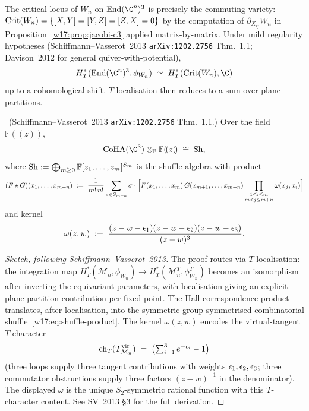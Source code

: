 \begin{remark}
\label{w17:rem:vanishing-cycle-local}
The critical locus of $W_n$ on $\mathrm{End}(\C^n)^3$ is precisely the commuting
variety: $\mathrm{Crit}(W_n) = \{[X, Y] = [Y, Z] = [Z, X] = 0\}$ by the computation of
$\partial_{X_{ij}} W_n$ in Proposition~\ref{w17:prop:jacobi-c3} applied matrix-by-matrix.
Under mild regularity hypotheses (Schiffmann--Vasserot~2013
\texttt{arXiv:1202.2756} Thm.~1.1; Davison~2012 for general quiver-with-potential),
\[
 H^*_T(\mathrm{End}(\C^n)^3, \phi_{W_n})
 \;\simeq\; H^*_T(\Crit(W_n), \C)
\]
up to a cohomological shift. $T$-localisation then reduces to a sum over plane
partitions.
\end{remark}

\begin{theorem}
\label{w17:thm:sv-shuffle}
\ClaimStatusProvedElsewhere\ (Schiffmann--Vasserot~2013 \texttt{arXiv:1202.2756}
Thm.~1.1.) Over the field $\mathbb{F}(\!(z)\!)$,
\[
 \CoHA(\C^3) \otimes_{\mathbb{F}} \mathbb{F}(\!(z)\!) \;\cong\; \Sh,
\]
where $\mathrm{Sh} := \bigoplus_{m \geq 0} \mathbb{F}[z_1, \ldots, z_m]^{S_m}$ is the
shuffle algebra with product
\begin{equation}
\label{w17:eq:shuffle-product}
 (F \star G)(x_1, \ldots, x_{m+n})
 \;:=\; \frac{1}{m!\, n!}
 \sum_{\sigma \in S_{m+n}} \sigma \cdot \Bigl[
  F(x_1, \ldots, x_m)\, G(x_{m+1}, \ldots, x_{m+n})
  \prod_{\substack{1 \leq i \leq m \\ m < j \leq m+n}} \omega(x_j, x_i)
 \Bigr]
\end{equation}
and kernel
\begin{equation}
\label{w17:eq:shuffle-kernel}
 \omega(z, w) \;:=\;
 \frac{(z - w - \epsilon_1)(z - w - \epsilon_2)(z - w - \epsilon_3)}{(z - w)^3}.
\end{equation}
\end{theorem}

\begin{proof}[Sketch, following Schiffmann--Vasserot~2013]
The proof routes via $T$-localisation: the integration map
$H^*_T(\mathcal{M}_n, \phi_{W_n}) \to H^*_T(\mathcal{M}_n^T, \phi_{W_n}^T)$ becomes
an isomorphism after inverting the equivariant parameters, with localisation giving
an explicit plane-partition contribution per fixed point. The Hall correspondence
product translates, after localisation, into the symmetric-group-symmetrised
combinatorial shuffle~\eqref{w17:eq:shuffle-product}. The kernel
$\omega(z, w)$ encodes the virtual-tangent $T$-character
\[
 \mathrm{ch}_T(T^{\mathrm{vir}}_{\mathcal{M}_n}) \;=\;
 \bigl(\textstyle\sum_{i=1}^{3} e^{-\epsilon_i} - 1\bigr)
\]
(three loops supply three tangent contributions with weights
$\epsilon_1, \epsilon_2, \epsilon_3$; three commutator obstructions supply three
factors $(z - w)^{-1}$ in the denominator). The displayed $\omega$ is the unique
$S_2$-symmetric rational function with this $T$-character content. See SV~2013
\S3 for the full derivation.
\end{proof}

